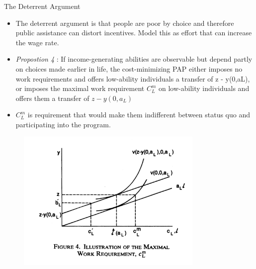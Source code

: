 \documentclass{beamer}
\begin{document}
\begin{frame}[allowframebreaks]{The Deterrent Argument}
\begin{itemize}
    \item The deterrent argument is that people are poor by choice and therefore public assistance can distort incentives. Model this as effort that can increase the wage rate.
    \item \textit{Propostion 4} : If income-generating
    abilities are observable but depend partly on
    choices made earlier in life, the cost-minimizing PAP either imposes no work requirements
    and offers low-ability individuals a transfer of
    z - y(0,aL), or imposes the maximal work
    requirement $C^m_L$ on low-ability individuals and
    offers them a transfer of $z-y(0,a_L)$
    \item $C^m_L$ is requirement that would make them indifferent between status quo and participating into the program. 

  
\end{itemize}

\begin{figure} 
\includegraphics[width=0.8\textwidth]{F4.png}
\end{figure}
\end{frame}
\end{document}

